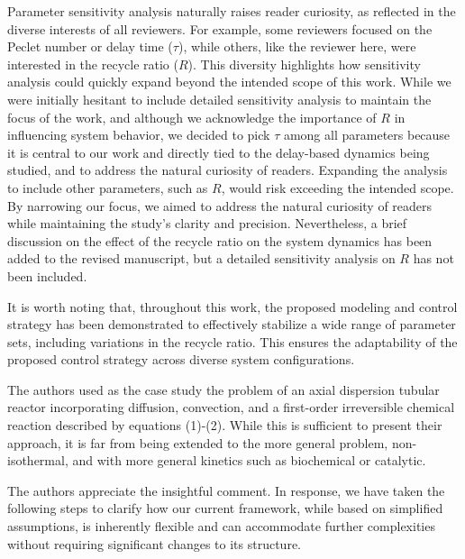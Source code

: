 \documentclass[11pt,answers]{exam}
\begin{document}
\begin{questions}
\begin{solutionorbox}
        Parameter sensitivity analysis naturally raises reader curiosity, as reflected in the diverse interests of all reviewers. For example, some reviewers focused on the Peclet number or delay time (\( \tau \)), while others, like the reviewer here, were interested in the recycle ratio (\( R \)). This diversity highlights how sensitivity analysis could quickly expand beyond the intended scope of this work. While we were initially hesitant to include detailed sensitivity analysis to maintain the focus of the work, and although we acknowledge the importance of \( R \) in influencing system behavior, we decided to pick \( \tau \) among all parameters because it is central to our work and directly tied to the delay-based dynamics being studied, and to address the natural curiosity of readers. Expanding the analysis to include other parameters, such as \( R \), would risk exceeding the intended scope. By narrowing our focus, we aimed to address the natural curiosity of readers while maintaining the study's clarity and precision. Nevertheless, a brief discussion on the effect of the recycle ratio on the system dynamics has been added to the revised manuscript, but a detailed sensitivity analysis on \( R \) has not been included.
        
        It is worth noting that, throughout this work, the proposed modeling and control strategy has been demonstrated to effectively stabilize a wide range of parameter sets, including variations in the recycle ratio. This ensures the adaptability of the proposed control strategy across diverse system configurations.
    \end{solutionorbox}

    
    \question The authors used as the case study the problem of an axial dispersion tubular reactor incorporating diffusion, convection, and a first-order irreversible chemical reaction described by equations (1)-(2). While this is sufficient to present their approach, it is far from being extended to the more general problem, non-isothermal, and with more general kinetics such as biochemical or catalytic.

    \begin{solutionorbox} \label{comment:2_3}
        The authors appreciate the insightful comment. In response, we have taken the following steps to clarify how our current framework, while based on simplified assumptions, is inherently flexible and can accommodate further complexities without requiring significant changes to its structure. 


\end{solutionorbox}
\end{questions}
\end{document}

